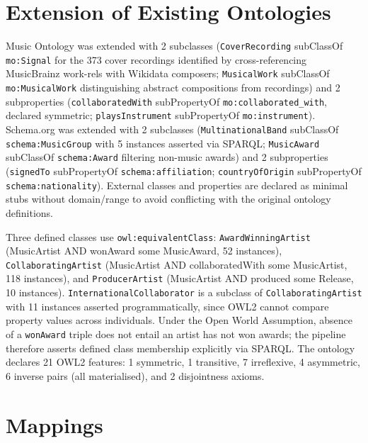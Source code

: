 \documentclass[11pt,a4paper]{article}
\begin{document}
\section{Extension of Existing Ontologies}

Music Ontology was extended with 2 subclasses (\texttt{CoverRecording} subClassOf \texttt{mo:Signal} for the 373 cover recordings identified by cross-referencing MusicBrainz work-rels with Wikidata composers; \texttt{MusicalWork} subClassOf \texttt{mo:MusicalWork} distinguishing abstract compositions from recordings) and 2 subproperties (\texttt{collaboratedWith} subPropertyOf \texttt{mo:collaborated\_with}, declared symmetric; \texttt{playsInstrument} subPropertyOf \texttt{mo:instrument}). Schema.org was extended with 2 subclasses (\texttt{MultinationalBand} subClassOf \texttt{schema:MusicGroup} with 5 instances asserted via SPARQL; \texttt{MusicAward} subClassOf \texttt{schema:Award} filtering non-music awards) and 2 subproperties (\texttt{signedTo} subPropertyOf \texttt{schema:affiliation}; \texttt{countryOfOrigin} subPropertyOf \texttt{schema:nationality}). External classes and properties are declared as minimal stubs without domain/range to avoid conflicting with the original ontology definitions.

Three defined classes use \texttt{owl:equivalentClass}: \texttt{AwardWinningArtist} (MusicArtist AND wonAward some MusicAward, 52 instances), \texttt{CollaboratingArtist} (MusicArtist AND collaboratedWith some MusicArtist, 118 instances), and \texttt{ProducerArtist} (MusicArtist AND produced some Release, 10 instances). \texttt{InternationalCollaborator} is a subclass of \texttt{CollaboratingArtist} with 11 instances asserted programmatically, since OWL2 cannot compare property values across individuals. Under the Open World Assumption, absence of a \texttt{wonAward} triple does not entail an artist has not won awards; the pipeline therefore asserts defined class membership explicitly via SPARQL. The ontology declares 21 OWL2 features: 1 symmetric, 1 transitive, 7 irreflexive, 4 asymmetric, 6 inverse pairs (all materialised), and 2 disjointness axioms.

\section{Mappings}
\end{document}
